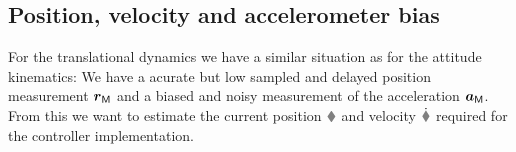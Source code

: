 

\subsection{Position, velocity and accelerometer bias}
For the translational dynamics we have a similar situation as for the attitude kinematics:
We have a acurate but low sampled and delayed position measurement $\boldsymbol{r}_{\mathsf{M}}$ and a biased and noisy measurement of the acceleration $\boldsymbol{a}_{\mathsf{M}}$.
From this we want to estimate the current position $\r$ and velocity $\rd$ required for the controller implementation.

